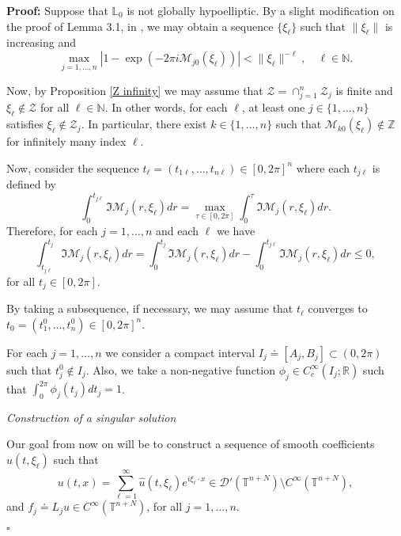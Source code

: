 \documentclass[12pt]{elsarticle}
\numberwithin{equation}{section}
\newenvironment{proof}[1][\noindent \textbf{Proof: }]{#1}{ \hfill $\square$ \vspace{2mm}}
\begin{document}
\begin{proof} Suppose that $\mathbb{L}_0$ is not globally hypoelliptic. 
	By a slight modification on the proof of Lemma 3.1, in \cite{BDG}, we may obtain a sequence $\{\xi_\ell\}$ such that $\|\xi_{\ell}\|$ is increasing and 
	\begin{equation}\label{inequality1}
	\max_{ j=1,\ldots,n} \left|1-\exp(- 2\pi i \mathcal{M}_{j0}(\xi_{\ell}))\right|< \|\xi_{\ell}\|^{-{\ell}}, 
	\quad \ell\in\mathbb{N}.
	\end{equation}

	
	Now, by Proposition \ref{Z infinity} we may assume that $\mathcal{Z}=\cap_{j=1}^{n}\mathcal{Z}_j$ is finite and  $\xi_{\ell}\notin\mathcal{Z}$ for all $\ell\in\mathbb{N}$. In other words,  for each $\ell$, at least one  $j\in\{1,\ldots,n\}$ satisfies $\xi_{\ell}\notin \mathcal{Z}_{j}$. In particular, there exist $k\in\{1,\ldots,n\}$ such that $\mathcal{M}_{k0}(\xi_{\ell})\notin \mathbb{Z}$ 	for infinitely many index $\ell$.
	
	Now, consider the sequence $t_{\ell}=(t_{1\ell},\ldots,t_{n\ell})\in[0,2\pi]^n$ where each $t_{j\ell}$ is defined by 	
	$$
	\int_{0}^{t_{j\ell}} \Im \mathcal{M}_j(r,\xi_{\ell})dr=	\max_{\tau\in[0,2\pi]}\int_{0}^{\tau} \Im \mathcal{M}_j(r,\xi_{\ell})dr.
	$$
	Therefore, for each $j=1,\ldots,n$ and each $\ell$ we have 
	\begin{equation}\label{inequality2} 
	\int_{t_{j\ell}}^{t_j} \Im \mathcal{M}_j(r,\xi_{\ell})dr= \int_{0}^{t_j} \Im \mathcal{M}_j(r,\xi_{\ell})dr- \int_{0}^{t_{j\ell}} \Im \mathcal{M}_j(r,\xi_{\ell})dr \leq 0,
	\end{equation}
	for all  $t_j\in[0,2\pi]$. 
	
	By taking a subsequence, if necessary, we may assume that $t_\ell$ converges to $t_0=(t_1^{0},\ldots,t_n^{0})\in[0,2\pi]^n$.
	
	For each $j=1,\ldots,n$ we consider a compact interval $I_j\doteq [A_j,B_j]\subset(0,2\pi)$ such that $t_j^{0}\notin I_j$. Also, we take a non-negative function $\phi_j\in C_c^{\infty}(I_j;\mathbb{R})$ such that $\int_{0}^{2\pi}\phi_j(t_j)dt_j=1$.\\
	
	\centerline {\it Construction of a singular solution }
	
	Our goal from now on will be to construct a sequence of smooth coefficients $\widehat{u}(t,\xi_\ell)$ such that 	
	$$
	u(t,x)=\sum_{\ell=1}^{\infty}\widehat{u}(t,\xi_\ell) e^{i\xi_\ell\cdot x}\in \mathcal{D}'(\mathbb{T}^{n+N})\setminus C^{\infty}(\mathbb{T}^{n+N}),
	$$	
	and $f_j\doteq L_j u \in  C^{\infty}(\mathbb{T}^{n+N})$, for all $j=1,\ldots, n$.	
	

\end{proof}
\end{document}
